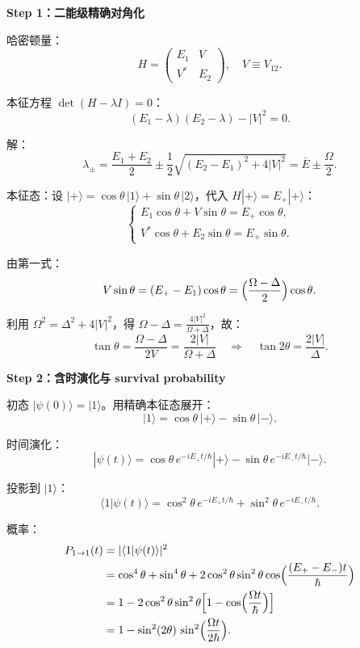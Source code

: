 \begin{derivationbox}
\textbf{Step 1：二能级精确对角化}

哈密顿量：
\[
H=\begin{pmatrix}E_1&V\\V^*&E_2\end{pmatrix},\quad V\equiv V_{12}.
\]

本征方程 $\det(H-\lambda I)=0$：
\[
(E_1-\lambda)(E_2-\lambda)-|V|^2=0.
\]

解：
\[
\lambda_{\pm}=\frac{E_1+E_2}{2}\pm\frac{1}{2}\sqrt{(E_2-E_1)^2+4|V|^2}
=\bar{E}\pm\frac{\Omega}{2}.
\]

本征态：设 $|+\rangle=\cos\theta\,|1\rangle+\sin\theta\,|2\rangle$，代入 $H|+\rangle=E_+|+\rangle$：
\[
\begin{cases}
E_1\cos\theta+V\sin\theta=E_+\cos\theta,\\
V^*\cos\theta+E_2\sin\theta=E_+\sin\theta.
\end{cases}
\]

由第一式：
\[
V\sin\theta=(E_+-E_1)\cos\theta=\Bigl(\frac{\Omega-\Delta}{2}\Bigr)\cos\theta.
\]

利用 $\Omega^2=\Delta^2+4|V|^2$，得 $\Omega-\Delta=\frac{4|V|^2}{\Omega+\Delta}$，故：
\[
\tan\theta=\frac{\Omega-\Delta}{2V}=\frac{2|V|}{\Omega+\Delta}
\quad\Rightarrow\quad
\tan2\theta=\frac{2|V|}{\Delta}.
\]

\textbf{Step 2：含时演化与 survival probability}

初态 $|\psi(0)\rangle=|1\rangle$。用精确本征态展开：
\[
|1\rangle=\cos\theta\,|+\rangle-\sin\theta\,|-\rangle.
\]

时间演化：
\[
|\psi(t)\rangle=\cos\theta\,e^{-iE_+t/\hbar}|+\rangle-\sin\theta\,e^{-iE_-t/\hbar}|-\rangle.
\]

投影到 $|1\rangle$：
\[
\langle1|\psi(t)\rangle=\cos^2\theta\,e^{-iE_+t/\hbar}+\sin^2\theta\,e^{-iE_-t/\hbar}.
\]

概率：
\begin{align*}
P_{1\to1}(t)&=|\langle1|\psi(t)\rangle|^2\\
&=\cos^4\theta+\sin^4\theta+2\cos^2\theta\sin^2\theta\cos\Bigl(\frac{(E_+-E_-)t}{\hbar}\Bigr)\\
&=1-2\cos^2\theta\sin^2\theta\Bigl[1-\cos\Bigl(\frac{\Omega t}{\hbar}\Bigr)\Bigr]\\
&=1-\sin^2(2\theta)\,\sin^2\Bigl(\frac{\Omega t}{2\hbar}\Bigr).
\end{align*}


\end{derivationbox}
